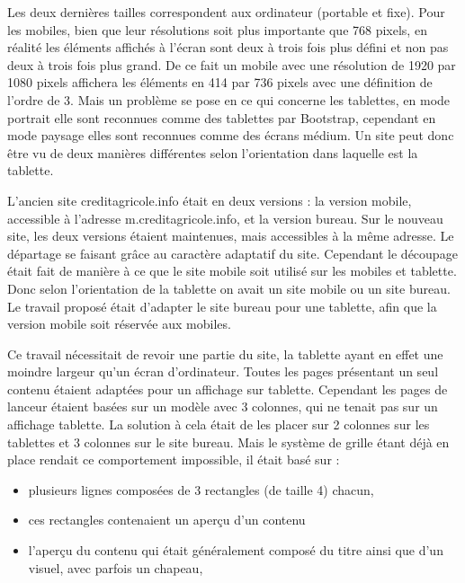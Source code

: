 \documentclass[12pt,a4paper]{article}
\begin{document}
Les deux dernières tailles correspondent aux ordinateur (portable et fixe). Pour les mobiles, bien que leur résolutions soit plus importante que 768 pixels, en réalité les éléments affichés à l'écran sont deux à trois fois plus défini et non pas deux à trois fois plus grand. De ce fait un mobile avec une résolution de 1920 par 1080 pixels affichera les éléments en 414 par 736 pixels avec une définition de l'ordre de 3. Mais un problème se pose en ce qui concerne les tablettes, en mode portrait elle sont reconnues comme des tablettes par Bootstrap, cependant en mode paysage elles sont reconnues comme des écrans médium. Un site peut donc être vu de deux manières différentes selon l'orientation dans laquelle est la tablette.\par
\bigskip
L'ancien site creditagricole.info était en deux versions : la version mobile, accessible à l'adresse m.creditagricole.info, et la version bureau. Sur le nouveau site, les deux versions étaient maintenues, mais accessibles à la même adresse. Le départage se faisant grâce au caractère adaptatif du site. Cependant le découpage était fait de manière à ce que le site mobile soit utilisé sur les mobiles et tablette. Donc selon l'orientation de la tablette on avait un site mobile ou un site bureau. Le travail proposé était d'adapter le site bureau pour une tablette, afin que la version mobile soit réservée aux mobiles.\par
Ce travail nécessitait de revoir une partie du site, la tablette ayant en effet une moindre largeur qu'un écran d'ordinateur. Toutes les pages présentant un seul contenu étaient adaptées pour un affichage sur tablette. Cependant les pages de lanceur étaient basées sur un modèle avec 3 colonnes, qui ne tenait pas sur un affichage tablette. La solution à cela était de les placer sur 2 colonnes sur les tablettes et 3 colonnes sur le site bureau. Mais le système de grille étant déjà en place rendait ce comportement impossible, il était basé sur :
\begin{itemize}
\item plusieurs lignes composées de 3 rectangles (de taille 4) chacun,
\item ces rectangles contenaient un aperçu d'un contenu
\item l'aperçu du contenu qui était généralement composé du titre ainsi que d'un visuel, avec parfois un chapeau,
\end{itemize}
\end{document}
